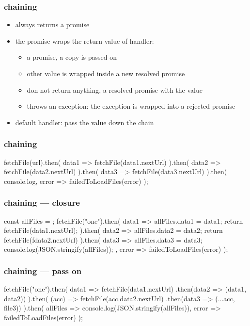 \begin{frame}[fragile] \frametitle{chaining}
\begin{itemize}
  \item {} always returns a promise
  \item the promise wraps the return value of  handler:
  \begin{itemize}
    \item a promise, a copy is passed on
    \item other value is wrapped inside a new resolved promise
    \item don not return anything, a resolved promise with the value 
    \item throws an exception: the exception is wrapped into a rejected promise
  \end{itemize}
  \item default handler: pass the value down the chain
\end{itemize}
\end{frame}

\begin{frame}[fragile] \frametitle{chaining}
\begin{CodeBox}{}
fetchFile(url).then(
  data1 => fetchFile(data1.nextUrl)
).then(
  data2 => fetchFile(data2.nextUrl)
).then(
  data3 => fetchFile(data3.nextUrl)
).then(
  console.log,
  error => failedToLoadFiles(error)
);
\end{CodeBox}
\end{frame}

\begin{frame}[fragile] \frametitle{chaining --- closure}
\begin{CodeBox}{}
const allFiles = {};
fetchFile("one").then(
  data1 => {
    allFiles.data1 = data1;
    return fetchFile(data1.nextUrl);
  }
).then(
  data2 => {
    allFiles.data2 = data2;
    return fetchFile(fdata2.nextUrl)
  }
).then(
  data3 => {
    allFiles.data3 = data3;
    console.log(JSON.stringify(allFiles));
  },
  error => failedToLoadFiles(error)
);
\end{CodeBox}
\end{frame}

\begin{frame}[fragile] \frametitle{chaining --- pass on}
\begin{CodeBox}{}
fetchFile("one").then(
  data1 => fetchFile(data1.nextUrl)
                .then(data2 => ({data1, data2}))
).then(
  (acc) => fetchFile(acc.data2.nextUrl)
                            .then(data3 => ({...acc, file3}))
).then(
  allFiles => console.log(JSON.stringify(allFiles)),
  error => failedToLoadFiles(error)
);
\end{CodeBox}
\end{frame}

